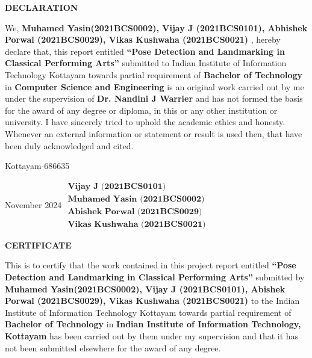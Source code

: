 \documentclass[12pt,a4wide]{report}
\theoremstyle{plain}
\theoremstyle{definition}
\theoremstyle{remark}
\begin{document}
\clearpage
 \setcounter{page}{2}
\begin{center}
{\large{\bf{DECLARATION}}}
\end{center}


\noindent We, \textbf{Muhamed Yasin(2021BCS0002), Vijay J (2021BCS0101), Abhishek Porwal (2021BCS0029), Vikas Kushwaha (2021BCS0021)} , hereby declare that, this report entitled
\textbf{``Pose Detection and Landmarking in Classical Performing Arts''} submitted to Indian
Institute of Information Technology Kottayam towards partial
requirement of {\bf Bachelor of Technology} in \textbf{Computer Science and Engineering}
is an original work carried out by me under the supervision of
\textbf{Dr. Nandini J Warrier} and has not formed the basis for the award
of any degree or diploma, in this or any other institution or
university. I have sincerely tried to uphold the academic ethics
and honesty. Whenever an external information or statement or
result is used then, that have been duly acknowledged and cited.

\vspace{4cm}

\noindent Kottayam-686635 

\noindent November 2024 \hfill 
$\begin{array}{l}
    \textbf{Vijay J (2021BCS0101)} \\
    \textbf{Muhamed Yasin (2021BCS0002)} \\
    \textbf{Abishek Porwal (2021BCS0029)} \\
    \textbf{Vikas Kushwaha (2021BCS0021)}
\end{array}$

\clearpage


 \setcounter{page}{3}
\begin{center}
{\large{\bf{CERTIFICATE}}}
\end{center}


\noindent This is to certify that the work contained in this
project report entitled \textbf{``Pose Detection and Landmarking in Classical Performing Arts''}
submitted by \textbf{Muhamed Yasin(2021BCS0002), Vijay J (2021BCS0101), 
Abishek Porwal (2021BCS0029), Vikas Kushwaha (2021BCS0021)} to the Indian Institute of Information Technology Kottayam
towards partial requirement of {\bf Bachelor of
Technology} in
\textbf{Indian Institute of Information Technology, Kottayam} has been carried out by them under my
supervision and that it has not been submitted elsewhere for the
award of any degree.
\end{document}
